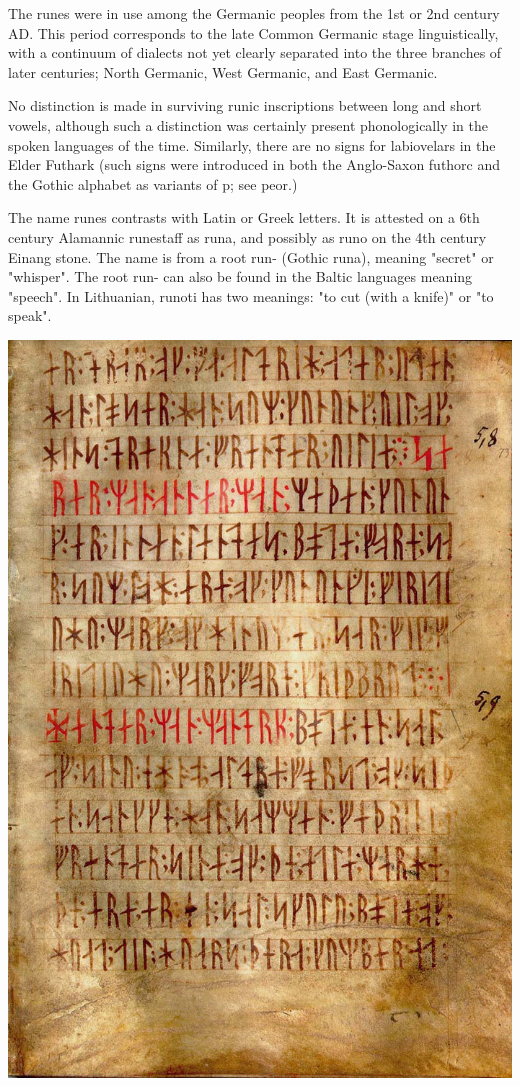 The runes were in use among the Germanic peoples from the 1st or 2nd century AD. This period corresponds to the late Common Germanic stage linguistically, with a continuum of dialects not yet clearly separated into the three branches of later centuries; North Germanic, West Germanic, and East Germanic.

No distinction is made in surviving runic inscriptions between long and short vowels, although such a distinction was certainly present phonologically in the spoken languages of the time. Similarly, there are no signs for labiovelars in the Elder Futhark (such signs were introduced in both the Anglo-Saxon futhorc and the Gothic alphabet as variants of p; see peor\thorn .)

The name runes contrasts with Latin or Greek letters. It is attested on a 6th century Alamannic runestaff as runa, and possibly as runo on the 4th century Einang stone. The name is from a root run- (Gothic runa), meaning "secret" or "whisper". The root run- can also be found in the Baltic languages meaning "speech". In Lithuanian, runoti has two meanings: "to cut (with a knife)" or "to speak".

\begin{marginfigure}%
  \includegraphics[width=0.3\linewidth]{./graphics/runicus}
  \label{fig:runicus}
\end{marginfigure}

